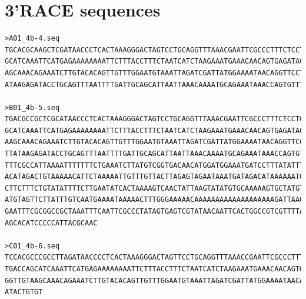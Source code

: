 \section{3'RACE sequences}
\begingroup\tiny
\begin{verbatim}
>A01_4b-4.seq 
TGCACGCAAGCTCGATAACCCTCACTAAAGGGACTAGTCCTGCAGGTTTAAACGAATTCGCCCTTTCTCCTGTTTCTGCTTTCTGAGTGTGAGATTAAAGGTGTTGTACCACCATGACCA
GCATCAAATTCATGAGAAAAAAAATTCTTTACCTTTCTAATCATCTAAGAAATGAAACAACAGTGAGATACTACTTCCTACCTGCTAGAATATATGAATGTTCATGTTGGTGAGGTTGTA
AGCAAACAGAAATCTTGTACACAGTTGTTTGGAATGTAAATTAGATCGATTATGGAAAATAACAGGTTCCTAAAAATTGCAATGACCTAGCAATTGTATTATAGAAATATATAGTGTGTT
ATAAGAGATACCTGCAGTTTAATTTTGATTGCAGCATTAATTAAACAAAATGCAGAAATAAACCAGTGTTTGTCAGTG

>B01_4b-5.seq
TGACGCCGCTCGCATAACCCTCACTAAAGGGACTAGTCCTGCAGGTTTAAACGAATTCGCCCTTTCTCCTGTTTCTGCTTTCTGAGTGTGAGATTAAAGGTGTTGTACCACCATGACCA
GCATCAAATTCATGAGAAAAAAAATTCTTTACCTTTCTAATCATCTAAGAAATGAAACAACAGTGAGATACTACTTCCTACCTGCTAGAATATATGAATGTTCATGTTGGTGAGGTTGT
AAGCAAACAGAAATCTTGTACACAGTTGTTTGGAATGTAAATTAGATCGATTATGGAAAATAACAGGTTCCTAAAAATTGCAATGACCTAGCAATTGTATTATAGAAATATATAGTGTG
TTATAAGAGATACCTGCAGTTTAATTTTGATTGCAGCATTAATTAAACAAAATGCAGAAATAAACCAGTGTTTGTCAGTGGCTAAACAAATAAAAATTGACATATATGATGATGTAATT
TTTCGCCATTAAAATTTTTTTCTGAAATCTTATGTCGGTGACAACATGGATGGAAATGATCCTTTATATTTTCAAAGAAATAAATCAGCACAAAAACAGGTAGTGCATCATCTTCCTGT
ACATAGACTGTAAAAACATTCTAAAAATTGTTTGTTACTTAGAGTAGAATAAATGATAGACATAAAAAATGCAAAATGAATAGAATGTAGTTCAGGACCAAAATTGTAGAGCATGGTGA
CTTCTTTCTGTATATTTTCTTGAATATCACTAAAAGTCAACTATTAAGTATATGTGCAAAAAGTGCTATGTTAGAATTTATAAACTCATTTGATGTATCACTTTTGCATATGATAATAT
ATGTAGTTCTTATTTGTCAATGAAAATAAAAACTTTGGGAAAAACAAAAAAAAAAAAAAAAAAAGATTAAGAATAAAAAAAAAAAAAAAAAAGTCTAGTCGACGCGTGGCACAAAGGGC
GAATTTCGCGGCCGCTAAATTTCAATTCGCCCTATAGTGAGTCGTATAACAATTCACTGGCCGTCGTTTTACAACGTCGTGACTGAAAAACCTGCCGTTACCAACTTAATCGCCTTGAC
AGCACATCCCCCATTACGCAAC

>C01_4b-6.seq
TCCACGCCCGCCTTAGATAACCCCTCACTAAAGGGACTAGTTCCTGCAGGTTTAAACCGAATTCGCCCTTTCTCCTGTTTCTGCTTTCTGAGTGTGAGATTAAAGGTGTTGTACCACCA
TGACCAGCATCAAATTCATGAGAAAAAAAATTCTTTACCTTTCTAATCATCTAAGAAATGAAACAACAGTGAGATACTACTTCCTACCTGCTAGAATATATGAATGTTCATGTTGGTGA
GGTTGTAAGCAAACAGAAATCTTGTACACAGTTGTTTGGAATGTAAATTAGATCGATTATGGAAAATAACAGGTTCCTAAAAATTGCAATGACCTATCAATTGTATTATCTAGAAATAT
ATACTGTGT


\end{verbatim}

